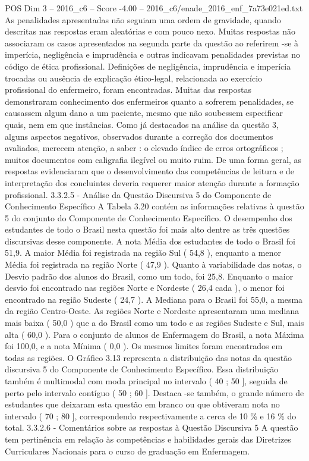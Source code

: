 \begin{textsample}{POS Dim 3 – 2016\_c6 – Score -4.00 – 2016\_c6/enade\_2016\_enf\_7a73e021ed.txt}
As penalidades apresentadas não seguiam uma ordem de gravidade, quando descritas nas respostas eram aleatórias e com pouco nexo.
Muitas respostas não associaram os casos apresentados na segunda parte da questão ao referirem -se à imperícia, negligência e imprudência e outras indicavam penalidades previstas no código de ética profissional.
Definições de negligência, imprudência e imperícia trocadas ou ausência de explicação ético-legal, relacionada ao exercício profissional do enfermeiro, foram encontradas.
Muitas das respostas demonstraram conhecimento dos enfermeiros quanto a sofrerem penalidades, se causassem algum dano a um paciente, mesmo que não soubessem especificar quais, nem em que instâncias.
Como já destacados na análise da questão 3, alguns aspectos negativos, observados durante a correção dos documentos avaliados, merecem atenção, a saber : o elevado índice de erros ortográficos ; muitos documentos com caligrafia ilegível ou muito ruim.
De uma forma geral, as respostas evidenciaram que o desenvolvimento das competências de leitura e de interpretação dos concluintes deveria requerer maior atenção durante a formação profissional. 3.3.2.5 - Análise da Questão Discursiva 5 do Componente de Conhecimento Específico A Tabela 3.20 contém as informações relativas à questão 5 do conjunto do Componente de Conhecimento Específico.
O desempenho dos estudantes de todo o Brasil nesta questão foi mais alto dentre as três questões discursivas desse componente.
A nota Média dos estudantes de todo o Brasil foi 51,9.
A maior Média foi registrada na região Sul ( 54,8 ), enquanto a menor Média foi registrada na região Norte ( 47,9 ).
Quanto à variabilidade das notas, o Desvio padrão dos alunos do Brasil, como um todo, foi 25,8.
Enquanto o maior desvio foi encontrado nas regiões Norte e Nordeste ( 26,4 cada ), o menor foi encontrado na região Sudeste ( 24,7 ).
A Mediana para o Brasil foi 55,0, a mesma da região Centro-Oeste.
As regiões Norte e Nordeste apresentaram uma mediana mais baixa ( 50,0 ) que a do Brasil como um todo e as regiões Sudeste e Sul, mais alta ( 60,0 ).
Para o conjunto de alunos de Enfermagem do Brasil, a nota Máxima foi 100,0, e a nota Mínima ( 0,0 ).
Os mesmos limites foram encontrados em todas as regiões.
O Gráfico 3.13 representa a distribuição das notas da questão discursiva 5 do Componente de Conhecimento Específico.
Essa distribuição também é multimodal com moda principal no intervalo ( 40 ; 50 ], seguida de perto pelo intervalo contíguo ( 50 ; 60 ].
Destaca -se também, o grande número de estudantes que deixaram esta questão em branco ou que obtiveram nota no intervalo ( 70 ; 80 ], correspondendo respectivamente a cerca de 10 \% e 16 \% do total. 3.3.2.6 - Comentários sobre as respostas à Questão Discursiva 5 A questão tem pertinência em relação às competências e habilidades gerais das Diretrizes Curriculares Nacionais para o curso de graduação em Enfermagem.

\end{textsample}

